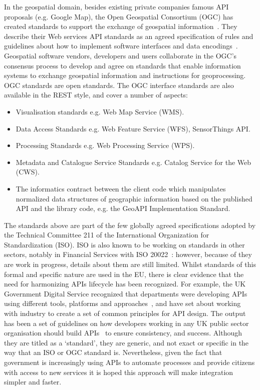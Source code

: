 In the geospatial domain, besides existing private companies famous API proposals
(e.g. Google Map), the Open Geospatial Consortium (OGC) has created standards to
support the exchange of geospatial information~\citep{opengeospatial}. They describe their Web services
API standards as an agreed specification of rules and guidelines about how to
implement software interfaces and data encodings~\citep{opengeospatial_elearning}. Geospatial software vendors,
developers and users collaborate in the OGC’s consensus process to develop and
agree on standards that enable information systems to exchange geospatial
information and instructions for geoprocessing. OGC standards are open standards.
The OGC interface standards are also available in the REST style, and cover a
number of aspects:
\begin{itemize}
	\item Visualisation standards e.g. Web Map Service (WMS).
	\item Data Access Standards e.g. Web Feature Service (WFS), SensorThings API.
	\item Processing Standards e.g. Web Processing Service (WPS).
	\item Metadata and Catalogue Service Standards e.g. Catalog Service for the Web (CWS).
	\item The informatics contract between the client code which manipulates normalized
	data structures of geographic information based on the published API and the library
	code, e.g. the GeoAPI Implementation Standard.
\end{itemize}

The standards above are part of the few globally agreed specifications adopted by
the Technical Committee 211 of the International Organization for Standardization
(ISO). ISO is also known to be working on standards in other sectors, notably in
Financial Services with ISO 20022~\citep{iso}: however, because of they are work in
progress,
details about them are still limited. Whilst standards of this formal and specific
nature are used in the EU, there is clear evidence that the need for harmonizing
APIs lifecycle has been recognized. For example, the UK Government Digital Service
recognized that departments were developing APIs using different tools, platforms
and approaches~\citep{tech_gov}, and have set about working with industry to create a set of
common principles for API design. The output has been a set of guidelines on how
developers working in any UK public sector organisation should build APIs~\citep{gov_uk_api} to
ensure consistency, and success. Although they are titled as a ‘standard’, they
are generic, and not exact or specific in the way that an ISO or OGC standard is.
Nevertheless, given the fact that government is increasingly using APIs to
automate processes and provide citizens with access to new services it is hoped
this approach will make integration simpler and faster.